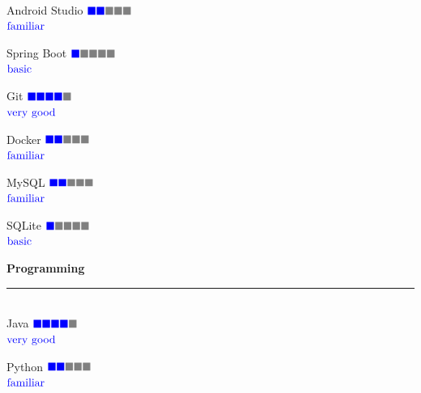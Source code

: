 \documentclass{article}
\begin{document}
\begin{minipage}[t]{0.3\linewidth}
  \large Android Studio \hfill $\color{blue} \blacksquare\color{blue} \blacksquare \color{gray} \blacksquare \color{gray} \blacksquare  \color{gray} \blacksquare$  \\[-0.8mm]
  \null\hfill \small{ $\color{blue} \textnormal{familiar}$}

  \large Spring Boot \hfill $\color{blue} \blacksquare\color{gray} \blacksquare \color{gray} \blacksquare \color{gray} \blacksquare  \color{gray} \blacksquare$  \\[-0.8mm]
  \null\hfill \small{ $\color{blue} \textnormal{basic}$}

  \large Git \hfill $\color{blue} \blacksquare\color{blue} \blacksquare \color{blue} \blacksquare \color{blue} \blacksquare  \color{gray} \blacksquare$  \\[-0.8mm]
  \null\hfill \small{ $\color{blue} \textnormal{very good}$}

  \large Docker \hfill $\color{blue} \blacksquare\color{blue} \blacksquare \color{gray} \blacksquare \color{gray} \blacksquare  \color{gray} \blacksquare$  \\[-0.8mm]
  \null\hfill \small{ $\color{blue} \textnormal{familiar}$}

  \large MySQL \hfill $\color{blue} \blacksquare\color{blue} \blacksquare \color{gray} \blacksquare \color{gray} \blacksquare  \color{gray} \blacksquare$  \\[-0.8mm]
  \null\hfill \small{ $\color{blue} \textnormal{familiar}$}

  \large SQLite \hfill $\color{blue} \blacksquare\color{gray} \blacksquare \color{gray} \blacksquare \color{gray} \blacksquare  \color{gray} \blacksquare$  \\[-0.8mm]
  \null\hfill \small{ $\color{blue} \textnormal{basic}$}

  \vspace{0.3cm}
  \textbf{\Large{\color{BlueViolet}Programming}}\\[-0.25cm]
  {\color{BlueViolet} \rule{\linewidth}{0.1mm} }\\
  \large Java \hfill $\color{blue} \blacksquare\color{blue} \blacksquare \color{blue} \blacksquare \color{blue} \blacksquare  \color{gray} \blacksquare$  \\[-0.8mm]
  \null\hfill \small{ $\color{blue} \textnormal{very good}$}

  \large Python \hfill $\color{blue} \blacksquare\color{blue} \blacksquare \color{gray} \blacksquare \color{gray} \blacksquare  \color{gray} \blacksquare$  \\[-0.8mm]
  \null\hfill \small{ $\color{blue} \textnormal{familiar}$}


\end{minipage}
\end{document}
